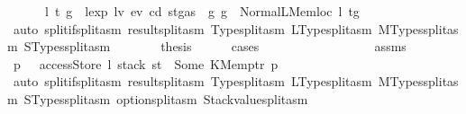 \begin{isabellebody}
\ \ \ \ {\isacharbar}{\kern0pt}\ {\isacharparenleft}{\kern0pt}{}{}{\isacharparenright}{\kern0pt}\ l\ t{\isacharprime}{\kern0pt}\ g{\isacharprime}{\kern0pt}\ \ {\isachardoublequoteopen}lexp\ lv\ ev\ cd\ {\isacharparenleft}{\kern0pt}st{\isasymlparr}gas\ {\isacharcolon}{\kern0pt}{\isacharequal}{\kern0pt}\ g{\isasymrparr}{\isacharparenright}{\kern0pt}\ g\ {\isacharequal}{\kern0pt}\ Normal{\isacharparenleft}{\kern0pt}{\isacharparenleft}{\kern0pt}LMemloc\ l{\isacharcomma}{\kern0pt}\ t{\isacharprime}{\kern0pt}{\isacharparenright}{\kern0pt}{\isacharcomma}{\kern0pt}g{\isacharprime}{\kern0pt}{\isacharparenright}{\kern0pt}{\isachardoublequoteclose}\isanewline
\ \ \ \ \ \ \isamarkupfalse%
\ {\isacharparenleft}{\kern0pt}auto\ split{\isacharcolon}{\kern0pt}if{\isacharunderscore}{\kern0pt}split{\isacharunderscore}{\kern0pt}asm\ result{\isachardot}{\kern0pt}split{\isacharunderscore}{\kern0pt}asm\ Type{\isachardot}{\kern0pt}split{\isacharunderscore}{\kern0pt}asm\ LType{\isachardot}{\kern0pt}split{\isacharunderscore}{\kern0pt}asm\ MTypes{\isachardot}{\kern0pt}split{\isacharunderscore}{\kern0pt}asm\ STypes{\isachardot}{\kern0pt}split{\isacharunderscore}{\kern0pt}asm{\isacharparenright}{\kern0pt}\isanewline
\ \ \ \ \isamarkupfalse%
\ \isamarkupfalse%
\ {\isacharquery}{\kern0pt}thesis\isanewline
\ \ \ \ \isamarkupfalse%
\ cases\isanewline
\ \ \ \ \ \ \isamarkupfalse%
\ {}{}\isanewline
\ \ \ \ \ \ \isamarkupfalse%
\ \isamarkupfalse%
\ assms\ {}\ {}{}\ \isamarkupfalse%
\ p{\isacharprime}{\kern0pt}\ \ {}{\isacharcolon}{\kern0pt}\ {\isachardoublequoteopen}accessStore\ l\ {\isacharparenleft}{\kern0pt}stack\ st{\isacharparenright}{\kern0pt}\ {\isacharequal}{\kern0pt}\ Some\ {\isacharparenleft}{\kern0pt}KMemptr\ p{\isacharprime}{\kern0pt}{\isacharparenright}{\kern0pt}{\isachardoublequoteclose}\isanewline
\ \ \ \ \ \ \ \ \isamarkupfalse%
\ {\isacharparenleft}{\kern0pt}auto\ split{\isacharcolon}{\kern0pt}if{\isacharunderscore}{\kern0pt}split{\isacharunderscore}{\kern0pt}asm\ result{\isachardot}{\kern0pt}split{\isacharunderscore}{\kern0pt}asm\ Type{\isachardot}{\kern0pt}split{\isacharunderscore}{\kern0pt}asm\ LType{\isachardot}{\kern0pt}split{\isacharunderscore}{\kern0pt}asm\ MTypes{\isachardot}{\kern0pt}split{\isacharunderscore}{\kern0pt}asm\ STypes{\isachardot}{\kern0pt}split{\isacharunderscore}{\kern0pt}asm\ option{\isachardot}{\kern0pt}split{\isacharunderscore}{\kern0pt}asm\ Stackvalue{\isachardot}{\kern0pt}split{\isacharunderscore}{\kern0pt}asm{\isacharparenright}{\kern0pt}\isanewline

\end{isabellebody}
